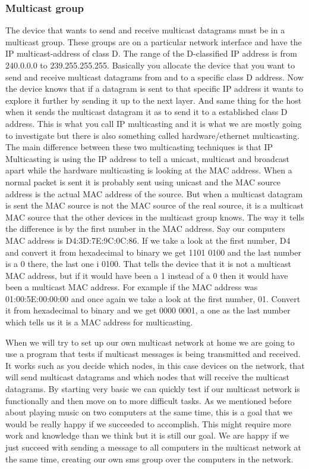 \documentclass[9pt,a4paper]{acmproc}
\begin{document}
\subsubsection{Multicast group}

The device that wants to send and receive multicast datagrams must be in a multicast group. These groups are on a particular network interface and have the IP multicast-address of class D. The range of the D-classified IP address is from 240.0.0.0 to 239.255.255.255. Basically you allocate the device that you want to send and receive multicast datagrams from and to a specific class D address. Now the device knows that if a datagram is sent to that specific IP address it wants to explore it further by sending it up to the next layer. And same thing for the host when it sends the multicast datagram it as to send it to a established class D address. This is what you call IP multicasting and it is what we are mostly going to investigate but there is also something called hardware/ethernet multicasting. The main difference between these two multicasting techniques is that IP Multicasting is using the IP address to tell a unicast, multicast and broadcast apart while the hardware multicasting is looking at the MAC address. When a normal packet is sent it is probably sent using unicast and the MAC source address is the actual MAC address of the source. But when a multicast datagram is sent the MAC source is not the MAC source of the real source, it is a multicast MAC source that the other devices in the multicast group knows. The way it tells the difference is by the first number in the MAC address. Say our computers MAC address is D4:3D:7E:9C:0C:86. If we take a look at the first number, D4 and convert it from hexadecimal to binary we get 1101 0100 and the last number is a 0 there, the last one i 0100. That tells the device that it is not a multicast MAC address, but if it would have been a 1 instead of a 0 then it would have been a multicast MAC address. For example if the MAC address was 01:00:5E:00:00:00 and once again we take a look at the first number, 01. Convert it from hexadecimal to binary and we get 0000 0001, a one as the last number which tells us it is a MAC address for multicasting.

When we will try to set up our own multicast network at home we are going to use a program that tests if multicast messages is being transmitted and received. It works such as you decide which nodes, in this case devices on the network, that will send multicast datagrams and which nodes that will receive the multicast datagrams. By starting very basic we can quickly test if our multicast network is functionally and then move on to more difficult tasks. As we mentioned before about playing music on two computers at the same time, this is a goal that we would be really happy if we succeeded to accomplish. This might require more work and knowledge than we think but it is still our goal. We are happy if we just succeed with sending a message to all computers in the multicast network at the same time, creating our own sms group over the computers in the network.
\end{document}
